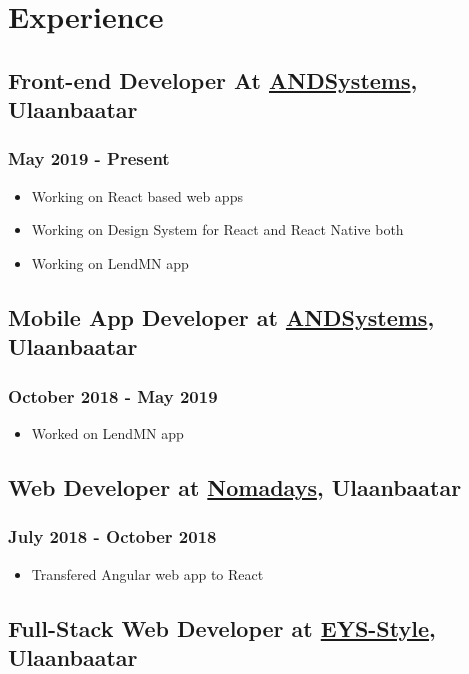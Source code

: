\documentclass[letterpaper]{article}
\date{\today}
\title{}
\begin{document}

\section{Experience}
\label{sec:org045f6c1}
\subsection{Front-end Developer At \href{https://andsystems.net}{ANDSystems}, Ulaanbaatar}
\label{sec:orgd091be0}
\subsubsection{May 2019 - Present}
\label{sec:org09e5709}
\begin{itemize}
\item Working on React based web apps
\item Working on Design System for React and React Native both
\item Working on LendMN app
\end{itemize}
\subsection{Mobile App Developer at \href{https://andsystems.net}{ANDSystems}, Ulaanbaatar}
\label{sec:orgf75b85d}
\subsubsection{October 2018 - May 2019}
\label{sec:org77a6211}
\begin{itemize}
\item Worked on LendMN app
\end{itemize}
\subsection{Web Developer at \href{https:nomadays.com}{Nomadays}, Ulaanbaatar}
\label{sec:org8333eea}
\subsubsection{July 2018 - October 2018}
\label{sec:org29dd89c}
\begin{itemize}
\item Transfered Angular web app to React
\end{itemize}
\subsection{Full-Stack Web Developer at \href{http:www.eys-style.com}{EYS-Style}, Ulaanbaatar}
\label{sec:orgb523e83}
\end{document}
